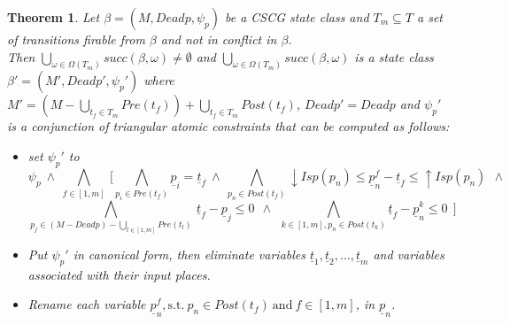 \documentclass[submission,copyright,creativecommons]{eptcs}
\newtheorem{theorem}{Theorem}
\numberwithin{equation}{section}
\begin{document}
\begin{theorem} \label{th1}
Let $\beta=(M,Deadp,\psi_p)$ be a CSCG state class and $T_m \subseteq T$ a set of transitions firable from $\beta$ and not in conflict in $\beta$.\\ Then $\underset{\omega \in \Omega(T_m)} \bigcup succ(\beta, \omega) \neq \emptyset$ and $\underset{\omega \in \Omega(T_m)} \bigcup succ(\beta, \omega)$ is a state class $\beta' = (M',Deadp', \psi_p')$ where $M' = (M - \underset{t_f \in T_m} \bigcup Pre(t_f)) + \underset{t_f \in T_m} \bigcup Post(t_f)$, $Deadp'=Deadp$ and $\psi_p'$ is a conjunction of triangular atomic constraints that can be computed as follows:
\begin{itemize}
\item set $\psi_p'$ to $$\psi_p \ \wedge \  \underset{f \in [1,m]} \bigwedge \ [ \underset{p_i \in Pre(t_{f})} \bigwedge  \underline{p}_i = \underline{t}_f \ \wedge \ \underset{p_n \in Post(t_{f})} \bigwedge {\downarrow Isp(p_{n})} \leq \underline{p}_{n}^f - \underline{t}_{f} \leq
{\uparrow Isp(p_{n})} \ \ \wedge \ $$
$$ \underset{p_j \in (M - Deadp)- \underset{l \in [1,m]} \bigcup Pre(t_{l})} \bigwedge   \  \underline{t}_{f} - \underline{p}_{j} \leq 0  \  \ \wedge \ \  \underset{ k \in[1,m], p_n \in Post(t_{k})} \bigwedge \underline{t}_{f} - \underline{p}_{n}^k \leq 0 \ \ ]$$
\item Put $\psi_p'$ in canonical form, then eliminate variables $\underline{t}_1, \underline{t}_2, ..., \underline{t}_m$ and variables associated with their input places. \item Rename each variable $\underline{p}_{n}^f, \text{s.t.} \ p_n \in Post(t_f) \ \text{and} \ f \in [1,m]$, in  $\underline{p}_{n}$.
\end{itemize}
\end{theorem}
\end{document}
